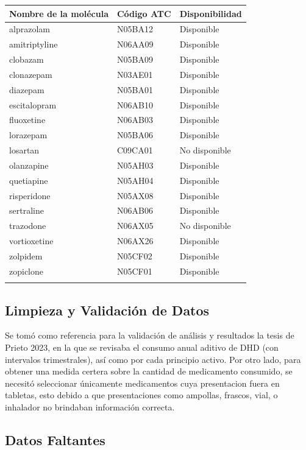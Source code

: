 \documentclass[10pt,twoside,xcolor=table,x11anmes]{IEEEtran}
\begin{document}
\begin{tabular}{lll}
\hline
Nombre de la molécula & Código ATC & Disponibilidad \\
\hline
alprazolam    & N05BA12 & Disponible \\
amitriptyline & N06AA09 & Disponible \\
clobazam      & N05BA09 & Disponible \\
clonazepam    & N03AE01 & Disponible \\
diazepam      & N05BA01 & Disponible \\
escitalopram  & N06AB10 & Disponible \\
fluoxetine    & N06AB03 & Disponible \\
lorazepam     & N05BA06 & Disponible \\
losartan      & C09CA01 & No disponible \\
olanzapine    & N05AH03 & Disponible \\
quetiapine    & N05AH04 & Disponible \\
risperidone   & N05AX08 & Disponible \\
sertraline    & N06AB06 & Disponible \\
trazodone     & N06AX05 & No disponible \\
vortioxetine  & N06AX26 & Disponible \\
zolpidem      & N05CF02 & Disponible \\
zopiclone     & N05CF01 & Disponible \\
\hline
\label{Moléculas consideradas para el estudio. La disponibilidad se marca según su existencia}
\end{tabular}

\subsection{Limpieza y Validación de Datos}

Se tomó como referencia para la validación de análisis y resultados la tesis de Prieto 2023, en la que se revisaba el consumo anual aditivo de DHD (con intervalos trimestrales), así como por cada principio activo. Por otro lado, para obtener una medida certera sobre la cantidad de medicamento consumido, se necesitó seleccionar únicamente medicamentos cuya presentacion fuera en tabletas, esto debido a que presentaciones como ampollas, frascos, vial, o inhalador no brindaban información correcta.

\subsection{Datos Faltantes}
\end{document}

